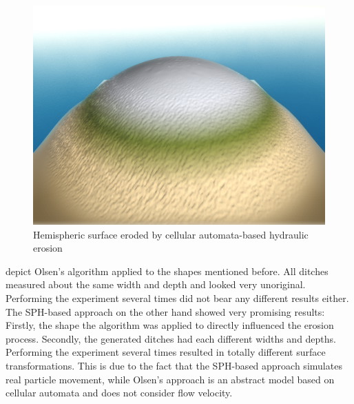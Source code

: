 \documentclass[11pt,a4paper,twoside,openright]{report}
\begin{document}
\begin{figure}[!htb]
  \includegraphics[width=\linewidth]{hydro-10mins-46k-iterations-hemisphere.png}
  \caption{Hemispheric surface eroded by cellular automata-based hydraulic erosion}\label{fig:hydro3}
\endminipage
\end{figure}
 depict Olsen's algorithm applied to the shapes mentioned before. All ditches measured about the same width and depth and looked very unoriginal. Performing the experiment several times did not bear any different results either. The SPH-based approach on the other hand showed very promising results: Firstly, the shape the algorithm was applied to directly influenced the erosion process. Secondly, the generated ditches had each different widths and depths. Performing the experiment several times resulted in totally different surface transformations. This is due to the fact that the SPH-based approach simulates real particle movement, while Olsen's approach is an abstract model based on cellular automata and does not consider flow velocity.
\end{document}

